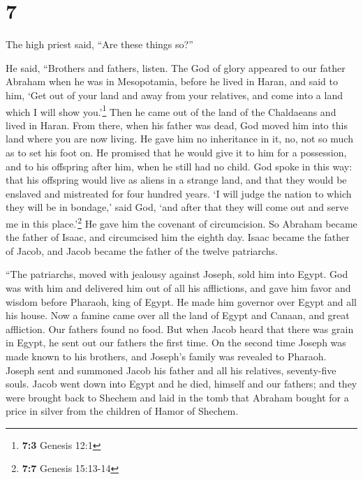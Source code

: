 \hypertarget{section-6}{%
\section{7}\label{section-6}}

 The high priest said, ``Are these things so?''

 He said, ``Brothers and fathers, listen. The God of glory
appeared to our father Abraham when he was in Mesopotamia, before he
lived in Haran,  and said to him, `Get out of your land
and away from your relatives, and come into a land which I will show
you.'\footnote{\textbf{7:3} Genesis 12:1}  Then he came
out of the land of the Chaldaeans and lived in Haran. From there, when
his father was dead, God moved him into this land where you are now
living.  He gave him no inheritance in it, no, not so much
as to set his foot on. He promised that he would give it to him for a
possession, and to his offspring after him, when he still had no child.
 God spoke in this way: that his offspring would live as
aliens in a strange land, and that they would be enslaved and mistreated
for four hundred years.  `I will judge the nation to which
they will be in bondage,' said God, `and after that they will come out
and serve me in this place.'\footnote{\textbf{7:7} Genesis 15:13-14}
 He gave him the covenant of circumcision. So Abraham
became the father of Isaac, and circumcised him the eighth day. Isaac
became the father of Jacob, and Jacob became the father of the twelve
patriarchs.

 ``The patriarchs, moved with jealousy against Joseph,
sold him into Egypt. God was with him  and delivered him
out of all his afflictions, and gave him favor and wisdom before
Pharaoh, king of Egypt. He made him governor over Egypt and all his
house.  Now a famine came over all the land of Egypt and
Canaan, and great affliction. Our fathers found no food. 
But when Jacob heard that there was grain in Egypt, he sent out our
fathers the first time.  On the second time Joseph was
made known to his brothers, and Joseph's family was revealed to Pharaoh.
 Joseph sent and summoned Jacob his father and all his
relatives, seventy-five souls.  Jacob went down into
Egypt and he died, himself and our fathers;  and they
were brought back to Shechem and laid in the tomb that Abraham bought
for a price in silver from the children of Hamor of Shechem.

